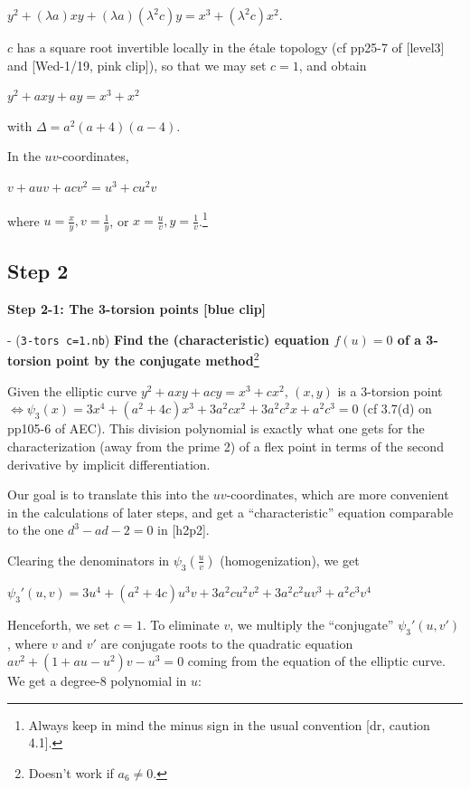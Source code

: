 \documentclass{rs}
\theoremstyle{definition}
\theoremstyle{remark}
\renewcommand{\=}{\approx}
\renewcommand{\-}{\sim}
\numberwithin{equation}{section}
\numberwithin{thm}{section}
\begin{document}
\centerline{$y^2 + (\lambda a) x y + (\lambda a) (\lambda^2 c) y = x^3 + (\lambda^2 c) x^2$.}

$c$ has a square root invertible locally in the \'etale topology (cf pp25-7 of [level3] and [Wed-1/19, pink clip]), so that we may set $c = 1$, and obtain

\centerline{$y^2 + a x y + a y = x^3 + x^2$}

with $\Delta = a^2(a + 4)(a - 4)$.

In the $uv$-coordinates,

\centerline{$v + a u v + a c v^2 = u^3 + c u^2 v$}

where $u = \frac{x}{y}, v = \frac{1}{y}$, or $x = \frac{u}{v}, y = \frac{1}{v}$.\footnote{Always keep in mind the minus sign in the usual convention [dr, caution 4.1].  }


\newpage
\subsection{Step 2}
\textbf{Step 2-1: The 3-torsion points [blue clip]}

- (\texttt{3-tors c=1.nb}) \textbf{Find the (characteristic) equation $f(u) = 0$ of a 3-torsion point by the conjugate method}\footnote{Doesn't work if $a_6 \neq 0$.  }

Given the elliptic curve $y^2 + a x y + a c y = x^3 + c x^2$, $(x,y)$ is a 3-torsion point $\Leftrightarrow \psi_3 (x) = 3x^4 + (a^2 + 4c) x^3 + 3a^2 c x^2 + 3a^2 c^2 x + a^2 c^3 = 0$ 
(cf 3.7(d) on pp105-6 of AEC). This division polynomial is exactly what one gets for the characterization (away from the prime 2) of a flex point 
in terms of the second derivative by implicit differentiation.

Our goal is to translate this into the $uv$-coordinates, which are more convenient in the calculations of later steps, 
and get a ``characteristic'' equation comparable to the one $d^3 - a d - 2 = 0$ in [h2p2]. 

Clearing the denominators in $\psi_3(\frac{u}{v})$ (homogenization), we get

\centerline{$\psi_3'(u,v) = 3u^4 + (a^2 + 4c) u^3 v + 3a^2 c u^2 v^2 + 3a^2 c^2 u v^3 + a^2 c^3 v^4$}

Henceforth, we set $c=1$. To eliminate $v$, we multiply the ``conjugate'' $\psi_3'(u,v')$, where $v$ and $v'$ are conjugate roots to the quadratic equation 
$a v^2 + (1 + a u - u^2) v - u^3 = 0$ coming from the equation of the elliptic curve. We get a degree-8 polynomial in $u$:
\end{document}
